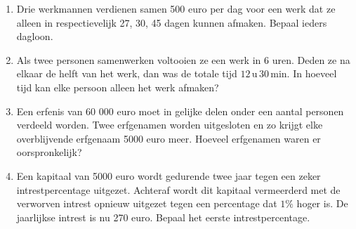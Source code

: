 \begin{enumerate}
\item Drie werkmannen verdienen samen 500 euro per dag voor een werk dat ze alleen in respectievelijk 27, 30, 45 dagen kunnen afmaken. Bepaal ieders dagloon.

\item Als twee personen samenwerken voltooien ze een werk in 6 uren. Deden ze na elkaar de helft van het werk, dan was de totale tijd $12\, \mathrm{u}\, 30 \, \mathrm{min}$. In hoeveel tijd kan elke persoon alleen het werk afmaken?

\item Een erfenis van 60 000 euro moet in gelijke delen onder een aantal personen verdeeld worden. Twee erfgenamen worden uitgesloten en zo krijgt elke overblijvende erfgenaam 5000 euro meer. Hoeveel erfgenamen waren er oorspronkelijk?


\item Een kapitaal van 5000 euro wordt gedurende twee jaar tegen een zeker intrestpercentage uitgezet.
Achteraf wordt dit kapitaal vermeerderd met de verworven intrest opnieuw uitgezet tegen een percentage dat $1\%$ hoger is. De jaarlijkse intrest is nu 270 euro. Bepaal het eerste intrestpercentage.


\end{enumerate}

